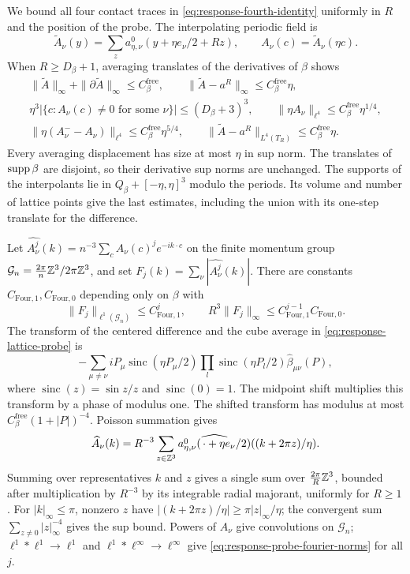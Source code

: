 We bound all four contact traces in
\eqref{eq:response-fourth-identity} uniformly in $R$ and the
position of the probe. The interpolating periodic field is
\[
 \widetilde A_\nu(y)=\sum_z
             a_{\eta,\nu}^0(y+\eta e_\nu/2+Rz),
 \qquad A_\nu(c)=\widetilde A_\nu(\eta c).
\]
When $R\ge D_\beta+1$, averaging translates of the derivatives
of $\beta$ shows
\begin{equation}\label{eq:response-probe-estimates}
 \begin{gathered}
 \|\widetilde A\|_\infty+\|\partial\widetilde A\|_\infty\le C_\beta^{\mathrm{free}},
 \qquad \|\widetilde A-a^R\|_\infty\le C_\beta^{\mathrm{free}}\eta,\\
 \eta^3|\{c:A_\nu(c)\ne0\text{ for some }\nu\}|\le(D_\beta+3)^3,
 \qquad
 \|\eta A_\nu\|_{\ell^4}\le C_\beta^{\mathrm{free}}\eta^{1/4},\\
 \|\eta(A_\nu^--A_\nu)\|_{\ell^4}\le C_\beta^{\mathrm{free}}\eta^{5/4},
 \qquad\|\widetilde A-a^R\|_{L^4(T_R)}\le C_\beta^{\mathrm{free}}\eta.
 \end{gathered}
\end{equation}
Every averaging displacement has size at most $\eta$ in
sup norm. The translates of $\operatorname{supp}\beta$ are disjoint,
so their derivative sup norms are unchanged. The supports
of the interpolants lie in $Q_\beta+[-\eta,\eta]^3$ modulo
the periods. Its volume and number of lattice points give
the last estimates, including the union with its one-step
translate for the difference.

Let $\widehat{A_\nu^j}(k)=n^{-3}\sum_cA_\nu(c)^je^{-ik\cdot c}$
on the finite momentum group $\mathcal G_n=\frac{2\pi}{n}\mathbb Z^3/
2\pi\mathbb Z^3$, and set $F_j(k)=\sum_\nu|\widehat{A_\nu^j}(k)|$.
There are constants $C_{\mathrm{Four},1},C_{\mathrm{Four},0}$ depending only on $\beta$ with
\begin{equation}\label{eq:response-probe-fourier-norms}
 \|F_j\|_{\ell^1(\mathcal G_n)}\le C_{\mathrm{Four},1}^j,
 \qquad R^3\|F_j\|_\infty\le C_{\mathrm{Four},1}^{j-1}C_{\mathrm{Four},0}.
\end{equation}
The transform of the centered difference and the cube average
in \eqref{eq:response-lattice-probe} is
\[
 -\sum_{\mu\ne\nu}iP_\mu\operatorname{sinc}(\eta P_\mu/2)
 \prod_l\operatorname{sinc}(\eta P_l/2)\widehat\beta_{\mu\nu}(P),
\]
where $\operatorname{sinc}(z)=\sin z/z$ and $\operatorname{sinc}(0)=1$.
The midpoint shift multiplies this transform by a phase of modulus one.
The shifted transform has modulus at most
$C_\beta^{\mathrm{free}}(1+|P|)^{-4}$. Poisson summation \cite[Theorems~4--7]{GuthFourier2015} gives
\[
 \widehat A_\nu(k)=R^{-3}\sum_{z\in\mathbb Z^3}
      \widehat{a_{\eta,\nu}^0(\,\cdot+\eta e_\nu/2)}
                                      ((k+2\pi z)/\eta).
\]
Summing over representatives $k$ and $z$ gives a single
sum over $\frac{2\pi}{R}\mathbb Z^3$, bounded after multiplication
by $R^{-3}$ by its integrable radial majorant, uniformly
for $R\ge1$. For $|k|_\infty\le\pi$, nonzero $z$ have
$|(k+2\pi z)/\eta|\ge\pi|z|_\infty/\eta$; the convergent
sum $\sum_{z\ne0}|z|_\infty^{-4}$ gives the sup bound.
Powers of $A_\nu$ give convolutions on $\mathcal G_n$;
$\ell^1*\ell^1\to\ell^1$ and $\ell^1*\ell^\infty\to\ell^\infty$
give \eqref{eq:response-probe-fourier-norms} for all $j$.

